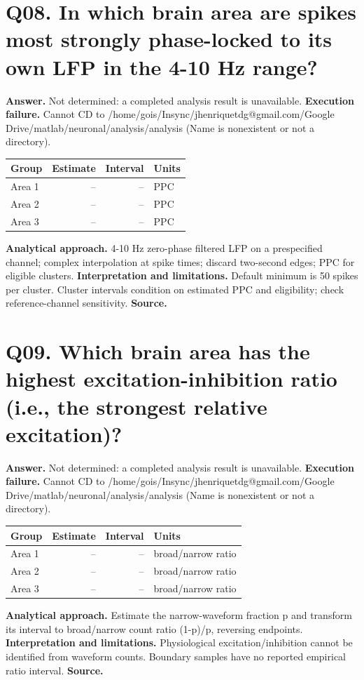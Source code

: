 \documentclass[11pt,a4paper]{article}
\begin{document}
\section*{Q08. In which brain area are spikes most strongly phase-locked to its own LFP in the 4-10 Hz range?}
\textbf{Answer.} Not determined: a completed analysis result is unavailable.
\textbf{Execution failure.} Cannot CD to /home/gois/Insync/jhenriquetdg@gmail.com/Google Drive/matlab/neuronal/analysis/analysis (Name is nonexistent or not a directory).
\begin{tabularx}{\linewidth}{XrrX}\toprule Group & Estimate & Interval & Units \\\midrule
Area 1 & -- & -- & PPC \\
Area 2 & -- & -- & PPC \\
Area 3 & -- & -- & PPC \\
\bottomrule\end{tabularx}
\textbf{Analytical approach.} 4-10 Hz zero-phase filtered LFP on a prespecified channel; complex interpolation at spike times; discard two-second edges; PPC for eligible clusters.
\textbf{Interpretation and limitations.} Default minimum is 50 spikes per cluster. Cluster intervals condition on estimated PPC and eligibility; check reference-channel sensitivity.
\textbf{Source.} 
\clearpage
\section*{Q09. Which brain area has the highest excitation-inhibition ratio (i.e., the strongest relative excitation)?}
\textbf{Answer.} Not determined: a completed analysis result is unavailable.
\textbf{Execution failure.} Cannot CD to /home/gois/Insync/jhenriquetdg@gmail.com/Google Drive/matlab/neuronal/analysis/analysis (Name is nonexistent or not a directory).
\begin{tabularx}{\linewidth}{XrrX}\toprule Group & Estimate & Interval & Units \\\midrule
Area 1 & -- & -- & broad/narrow ratio \\
Area 2 & -- & -- & broad/narrow ratio \\
Area 3 & -- & -- & broad/narrow ratio \\
\bottomrule\end{tabularx}
\textbf{Analytical approach.} Estimate the narrow-waveform fraction p and transform its interval to broad/narrow count ratio (1-p)/p, reversing endpoints.
\textbf{Interpretation and limitations.} Physiological excitation/inhibition cannot be identified from waveform counts. Boundary samples have no reported empirical ratio interval.
\textbf{Source.} 
\clearpage
\end{document}
